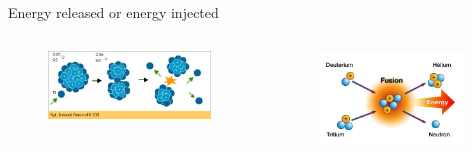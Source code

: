 \documentclass[aspectratio=1610,pdftex,dvipsnames,compress,xcolor={dvipsnames}]{beamer}
\begin{document}
\begin{frame}{Energy released or energy injected}
    \begin{columns}

        \begin{column}{0.50\textwidth}
            \begin{figure}
                \centering
                \includegraphics[width=0.95\textwidth]{fission.jpg}
            \end{figure}
        \end{column}

        \begin{column}{0.50\textwidth}
            \begin{figure}
                \centering
                \includegraphics[width=0.95\textwidth]{fusion.jpg}
            \end{figure}
        \end{column}

    \end{columns}
\end{frame}
\end{document}
